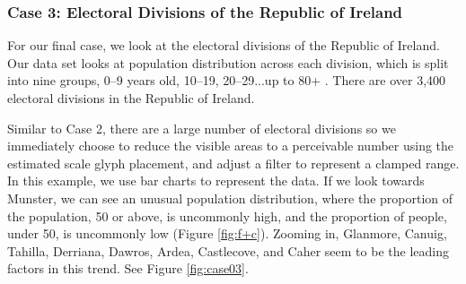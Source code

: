\subsubsection{Case 3: Electoral Divisions of the Republic of Ireland} \label{sec:case03}

For our final case, we look at the electoral divisions of the Republic of Ireland. Our data set looks at population distribution across each division, which is split into nine groups, 0--9 years old, 10--19, 20--29...up to 80+ \cite{electoralDivisions}. There are over 3,400 electoral divisions in the Republic of Ireland.

Similar to Case 2, there are a large number of electoral divisions so we immediately choose to reduce the visible areas to a perceivable number using the estimated scale glyph placement, and adjust a filter to represent a clamped range. In this example, we use bar charts to represent the data. If we look towards Munster, we can see an unusual population distribution, where the proportion of the population, 50 or above, is uncommonly high, and the proportion of people, under 50, is uncommonly low (Figure \ref{fig:f+c}). Zooming in, Glanmore, Canuig, Tahilla, Derriana, Dawros, Ardea, Castlecove, and Caher seem to be the leading factors in this trend. See Figure \ref{fig:case03}.

